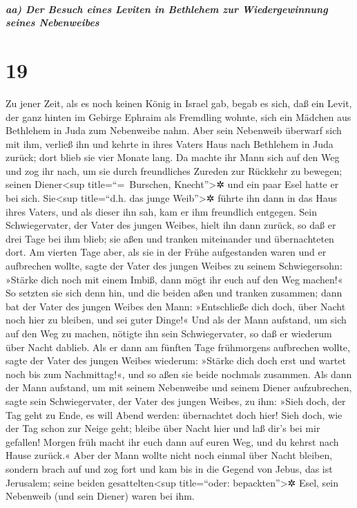 \hypertarget{aa-der-besuch-eines-leviten-in-bethlehem-zur-wiedergewinnung-seines-nebenweibes}{%
\subparagraph{aa) Der Besuch eines Leviten in Bethlehem zur
Wiedergewinnung seines
Nebenweibes}\label{aa-der-besuch-eines-leviten-in-bethlehem-zur-wiedergewinnung-seines-nebenweibes}}

\hypertarget{section-18}{%
\section{19}\label{section-18}}

Zu jener Zeit, als es noch keinen König in Israel gab,
begab es sich, daß ein Levit, der ganz hinten im Gebirge Ephraim als
Fremdling wohnte, sich ein Mädchen aus Bethlehem in Juda zum Nebenweibe
nahm. Aber sein Nebenweib überwarf sich mit ihm, verließ
ihn und kehrte in ihres Vaters Haus nach Bethlehem in Juda zurück; dort
blieb sie vier Monate lang. Da machte ihr Mann sich auf
den Weg und zog ihr nach, um sie durch freundliches Zureden zur Rückkehr
zu bewegen; seinen Diener\textless sup title=``=~Burschen,
Knecht''\textgreater✲ und ein paar Esel hatte er bei sich.
Sie\textless sup title=``d.h. das junge Weib''\textgreater✲ führte ihn
dann in das Haus ihres Vaters, und als dieser ihn sah, kam er ihm
freundlich entgegen. Sein Schwiegervater, der Vater des
jungen Weibes, hielt ihn dann zurück, so daß er drei Tage bei ihm blieb;
sie aßen und tranken miteinander und übernachteten dort.
Am vierten Tage aber, als sie in der Frühe aufgestanden
waren und er aufbrechen wollte, sagte der Vater des jungen Weibes zu
seinem Schwiegersohn: »Stärke dich noch mit einem Imbiß, dann mögt ihr
euch auf den Weg machen!« So setzten sie sich denn hin,
und die beiden aßen und tranken zusammen; dann bat der Vater des jungen
Weibes den Mann: »Entschließe dich doch, über Nacht noch hier zu
bleiben, und sei guter Dinge!« Und als der Mann aufstand,
um sich auf den Weg zu machen, nötigte ihn sein Schwiegervater, so daß
er wiederum über Nacht dablieb. Als er dann am fünften
Tage frühmorgens aufbrechen wollte, sagte der Vater des jungen Weibes
wiederum: »Stärke dich doch erst und wartet noch bis zum Nachmittag!«,
und so aßen sie beide nochmals zusammen. Als dann der Mann
aufstand, um mit seinem Nebenweibe und seinem Diener aufzubrechen, sagte
sein Schwiegervater, der Vater des jungen Weibes, zu ihm: »Sieh doch,
der Tag geht zu Ende, es will Abend werden: übernachtet doch hier! Sieh
doch, wie der Tag schon zur Neige geht; bleibe über Nacht hier und laß
dir's bei mir gefallen! Morgen früh macht ihr euch dann auf euren Weg,
und du kehrst nach Hause zurück.« Aber der Mann wollte
nicht noch einmal über Nacht bleiben, sondern brach auf und zog fort und
kam bis in die Gegend von Jebus, das ist Jerusalem; seine beiden
gesattelten\textless sup title=``oder: bepackten''\textgreater✲ Esel,
sein Nebenweib (und sein Diener) waren bei ihm.

